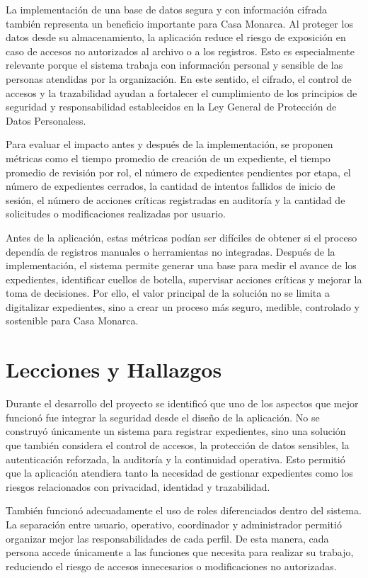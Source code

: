 \documentclass[10pt, letterpaper]{article}
\begin{document}
La implementación de una base de datos segura y con información cifrada también representa un beneficio importante para Casa Monarca. Al proteger los datos desde su almacenamiento, la aplicación reduce el riesgo de exposición en caso de accesos no autorizados al archivo o a los registros. Esto es especialmente relevante porque el sistema trabaja con información personal y sensible de las personas atendidas por la organización. En este sentido, el cifrado, el control de accesos y la trazabilidad ayudan a fortalecer el cumplimiento de los principios de seguridad y responsabilidad establecidos en la Ley General de Protección de Datos Personaless.

Para evaluar el impacto antes y después de la implementación, se proponen métricas como el tiempo promedio de creación de un expediente, el tiempo promedio de revisión por rol, el número de expedientes pendientes por etapa, el número de expedientes cerrados, la cantidad de intentos fallidos de inicio de sesión, el número de acciones críticas registradas en auditoría y la cantidad de solicitudes o modificaciones realizadas por usuario.

Antes de la aplicación, estas métricas podían ser difíciles de obtener si el proceso dependía de registros manuales o herramientas no integradas. Después de la implementación, el sistema permite generar una base para medir el avance de los expedientes, identificar cuellos de botella, supervisar acciones críticas y mejorar la toma de decisiones. Por ello, el valor principal de la solución no se limita a digitalizar expedientes, sino a crear un proceso más seguro, medible, controlado y sostenible para Casa Monarca.


\section{Lecciones y Hallazgos}

Durante el desarrollo del proyecto se identificó que uno de los aspectos que mejor funcionó fue integrar la seguridad desde el diseño de la aplicación. No se construyó únicamente un sistema para registrar expedientes, sino una solución que también considera el control de accesos, la protección de datos sensibles, la autenticación reforzada, la auditoría y la continuidad operativa. Esto permitió que la aplicación atendiera tanto la necesidad de gestionar expedientes como los riesgos relacionados con privacidad, identidad y trazabilidad.

También funcionó adecuadamente el uso de roles diferenciados dentro del sistema. La separación entre usuario, operativo, coordinador y administrador permitió organizar mejor las responsabilidades de cada perfil. De esta manera, cada persona accede únicamente a las funciones que necesita para realizar su trabajo, reduciendo el riesgo de accesos innecesarios o modificaciones no autorizadas.
\end{document}
